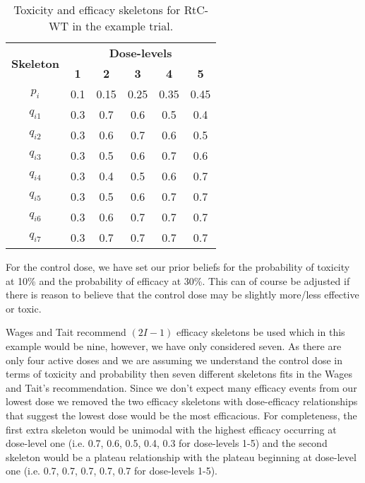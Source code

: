 \begin{table}[!h]
	\centering
	\caption{Toxicity and efficacy skeletons for RtC-WT in the example trial.}
	\label{tab_wt:tox-eff-skeleton}
	\begin{tabular}{c|ccccc}
		\hline
		\multicolumn{1}{c|}{\multirow{2}{*}{\textbf{Skeleton}}} & \multicolumn{5}{c}{\textbf{Dose-levels}}                       \\
		\multicolumn{1}{c|}{}                                   & \textbf{1} & \textbf{2} & \textbf{3} & \textbf{4} & \textbf{5} \\ \hline
		$p_i$    & 0.1 & 0.15 & 0.25 & 0.35 & 0.45 \\
		$q_{i1}$ & 0.3 & 0.7 & 0.6 & 0.5 & 0.4 \\
		$q_{i2}$ & 0.3 & 0.6 & 0.7 & 0.6 & 0.5 \\
		$q_{i3}$ & 0.3 & 0.5 & 0.6 & 0.7 & 0.6 \\
		$q_{i4}$ & 0.3 & 0.4 & 0.5 & 0.6 & 0.7 \\
		$q_{i5}$ & 0.3 & 0.5 & 0.6 & 0.7 & 0.7 \\
		$q_{i6}$ & 0.3 & 0.6 & 0.7 & 0.7 & 0.7 \\
		$q_{i7}$ & 0.3 & 0.7 & 0.7 & 0.7 & 0.7 \\ \hline
	\end{tabular}
\end{table}

For the control dose, we have set our prior beliefs for the probability of toxicity at 10\% and the probability of efficacy at 30\%. This can of course be adjusted if there is reason to believe that the control dose may be slightly more/less effective or toxic. 

Wages and Tait recommend $(2I-1)$ efficacy skeletons be used which in this example would be nine, however, we have only considered seven. As there are only four active doses and we are assuming we understand the control dose in terms of toxicity and probability then seven different skeletons fits in the Wages and Tait's recommendation. Since we don't expect many efficacy events from our lowest dose we removed the two efficacy skeletons with dose-efficacy relationships that suggest the lowest dose would be the most efficacious. For completeness, the first extra skeleton would be unimodal with the highest efficacy occurring at dose-level one (i.e. 0.7, 0.6, 0.5, 0.4, 0.3 for dose-levels 1-5) and the second skeleton would be a plateau relationship with the plateau beginning at dose-level one (i.e. 0.7, 0.7, 0.7, 0.7, 0.7 for dose-levels 1-5). 

